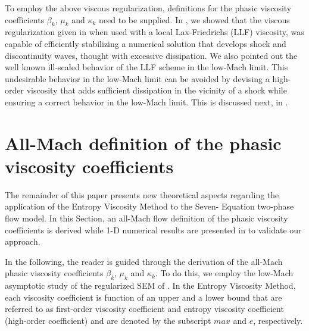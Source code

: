 \documentclass[preprint,10pt]{elsarticle}
\begin{document}
%
To employ the above viscous regularization, definitions for the phasic viscosity coefficients $\beta_k$, $\mu_k$ and $\kappa_k$ need to be supplied. 
In \cite{Marco_paper_sem}, we showed that the viscous regularization given in  when used with a local Lax-Friedrichs (LLF) 
viscosity, was capable of efficiently stabilizing a numerical solution that develops shock and discontinuity waves, thought with excessive dissipation. 
We also pointed out the well known ill-scaled behavior of the LLF scheme in the low-Mach limit. This undesirable behavior in the low-Mach limit can be avoided 
by devising a high-order viscosity that adds sufficient dissipation in the vicinity of a shock while ensuring a correct behavior in the low-Mach limit. 
This is discussed next, in .
%  

\section{All-Mach definition of the phasic viscosity coefficients}\label{sec:visc-def}
%
%
The remainder of this paper presents new theoretical aspects regarding the application of the Entropy Viscosity Method to the Seven-
Equation two-phase flow model. 
In this Section, an all-Mach flow definition of the phasic viscosity coefficients is derived while 1-D numerical results are presented in 
 to validate our approach.

In the following, the reader is guided through the derivation of the all-Mach phasic viscosity coefficients $\beta_k$, $\mu_k$ and $\kappa_k$. To do this, we employ 
the low-Mach asymptotic study of the regularized SEM of \cite{Marco_paper_sem}. 
In the Entropy Viscosity Method, each viscosity coefficient is function of an upper and a lower bound that are referred to as first-order 
viscosity coefficient and entropy viscosity coefficient (high-order coefficient) 
and are denoted by the subscript $max$ and $e$, respectively. 
%
\end{document}
